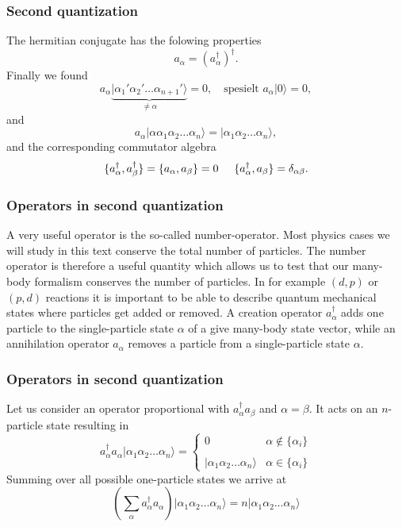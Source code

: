 \documentclass[compress]{beamer}
\newcommand*{\ket}[1]{|#1\rangle}
\begin{document}
\frame
{
  \frametitle{Second quantization}
\begin{small}
{\scriptsize
The hermitian conjugate has the folowing properties
\[
        a_{\alpha} = ( a_{\alpha}^\dagger )^\dagger.
\]
Finally we found 
\[
	a_\alpha\underbrace{\ket{\alpha_1'\alpha_2' \dots \alpha_{n+1}'}}_{\neq \alpha} = 0, \quad
		\textrm{spesielt } a_\alpha \ket{0} = 0,
\]
and 
\[
 a_\alpha \ket{\alpha\alpha_1\alpha_2 \dots \alpha_{n}} = \ket{\alpha_1\alpha_2 \dots \alpha_{n}},
\]
and the corresponding commutator algebra
\[
	\{a_{\alpha}^\dagger,a_{\beta}^\dagger\} = \{a_{\alpha},a_{\beta}\} = 0 \hspace{0.5cm} 
\{a_\alpha^\dagger,a_\beta \} = \delta_{\alpha\beta}.
\]
}
\end{small}
}

\frame
{
  \frametitle{Operators in second quantization}
\begin{small}
{\scriptsize
A very useful operator is the so-called number-operator.  Most physics cases  we will
study in this text conserve the total number of particles.  The number operator is therefore
a useful quantity which allows us to test that our many-body formalism  conserves the number of particles.
In for example $(d,p)$ or $(p,d)$ reactions it is important to be able to describe quantum mechanical states
where particles get added or removed.
A creation operator $a_\alpha^\dagger$ adds one particle to the single-particle state
$\alpha$ of a give many-body state vector, while an annihilation operator $a_\alpha$ 
removes a particle from a single-particle
state $\alpha$. 
}
\end{small}
}


\frame
{
  \frametitle{Operators in second quantization}
\begin{small}
{\scriptsize
Let us consider an operator proportional with $a_\alpha^\dagger a_\beta$ and 
$\alpha=\beta$. It acts on an $n$-particle state 
resulting in
\begin{equation}
	a_\alpha^\dagger a_\alpha \ket{\alpha_1\alpha_2 \dots \alpha_{n}} = 
	\begin{cases}
		0  &\alpha \notin \{\alpha_i\} \\
		\\
		\ket{\alpha_1\alpha_2 \dots \alpha_{n}} & \alpha \in \{\alpha_i\}
	\end{cases}
\end{equation}
Summing over all possible one-particle states we arrive at
\begin{equation}
	\left( \sum_\alpha a_\alpha^\dagger a_\alpha \right) \ket{\alpha_1\alpha_2 \dots \alpha_{n}} = 
	n \ket{\alpha_1\alpha_2 \dots \alpha_{n}} \label{eq:2-21}
\end{equation}
}
\end{small}
}
\end{document}
